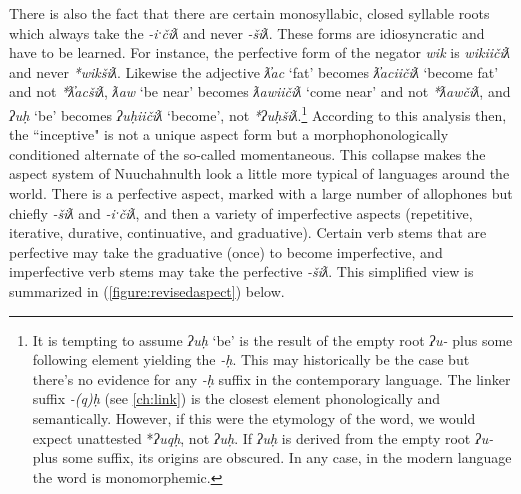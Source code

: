 There is also the fact that there are certain monosyllabic, closed syllable roots which always take the \textit{-iˑčiƛ} and never \textit{-šiƛ}. These forms are idiosyncratic and have to be learned. For instance, the perfective form of the negator \textit{wik} is \textit{wikiičiƛ} and never \textit{*wikšiƛ}. Likewise the adjective \textit{ƛ̓ac} `fat' becomes \textit{ƛ̓aciičiƛ} `become fat' and not \textit{*ƛ̓acšiƛ}, \textit{ƛaw} `be near' becomes \textit{ƛawiičiƛ} `come near' and not \textit{*ƛawčiƛ}, and \textit{ʔuḥ} `be' becomes \textit{ʔuḥiičiƛ} `become', not \textit{*ʔuḥšiƛ}.\footnote{It is tempting to assume \textit{ʔuḥ} `be' is the result of the empty root \textit{ʔu-} plus some following element yielding the \textit{-ḥ}. This may historically be the case but there's no evidence for any \textit{-ḥ} suffix in the contemporary language. The linker suffix \textit{-(q)ḥ} (see \cref{ch:link}) is the closest element phonologically and semantically. However, if this were the etymology of the word, we would expect unattested *\textit{ʔuqḥ}, not \textit{ʔuḥ}. If \textit{ʔuḥ} is derived from the empty root \textit{ʔu-} plus some suffix, its origins are obscured. In any case, in the modern language the word is monomorphemic.} According to this analysis then, the ``inceptive" is not a unique aspect form but a morphophonologically conditioned alternate of the so-called momentaneous. This collapse makes the aspect system of Nuuchahnulth look a little more typical of languages around the world. There is a perfective aspect, marked with a large number of allophones but chiefly \textit{-šiƛ} and \textit{-iˑčiƛ}, and then a variety of imperfective aspects (repetitive, iterative, durative, continuative, and graduative). Certain verb stems that are perfective may take the graduative (once) to become imperfective, and imperfective verb stems may take the perfective \textit{-šiƛ}. This simplified view is summarized in (\ref{figure:revisedaspect}) below.

